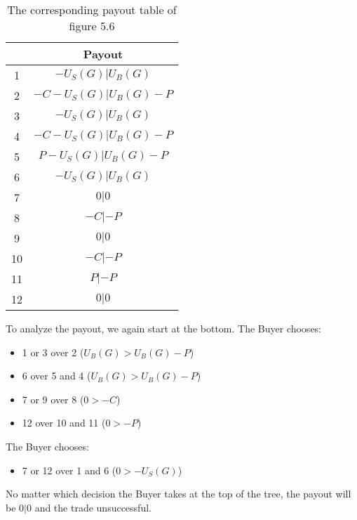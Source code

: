 \documentclass{cacthesis}
\begin{document}
\begin{table}[htb!]
\centering
    \begin{tabular}{ |c|c| }
    \hline
    & Payout  \\
    \hline
    \hline
    1& $-U_S(G)| U_B(G)$\\
    \hline
    2& $-C-U_S(G)|U_B(G) -P$\\
    \hline
    3&$-U_S(G)|U_B(G)$ \\
    \hline
    4& $-C-U_S(G)|U_B(G)-P$ \\
    \hline
    5& $P-U_S(G)| U_B(G) - P$\\
    \hline 
    6& $-U_S(G)|U_B(G)$\\
    \hline
    7& $0|0$\\
    \hline
    8& $-C | -P$\\
    \hline
    9& $0|0$\\
    \hline
    10& $-C|-P$\\
    \hline
    11& $P| -P$\\
    \hline
    12& $0| 0$\\
    \hline
    \end{tabular}
\caption{The corresponding payout table of figure 5.6}
\end{table}

To analyze the payout, we again start at the bottom. The Buyer chooses:
\begin{itemize}
    \item 1 or 3 over 2 ($U_B(G) > U_B(G) - P$)
    \item 6 over 5 and 4  ($U_B(G) > U_B(G) - P$)
    \item 7 or 9 over 8 ($0 > -C$)
    \item 12 over 10 and 11 ($0 > -P$)
\end{itemize}
The Buyer chooses:
\begin{itemize}
    \item 7 or 12 over 1 and 6 ($0>-U_S(G)$)
\end{itemize}
No matter which decision the Buyer takes at the top of the tree, the payout will be $0|0$ and the trade unsuccessful.
\end{document}
